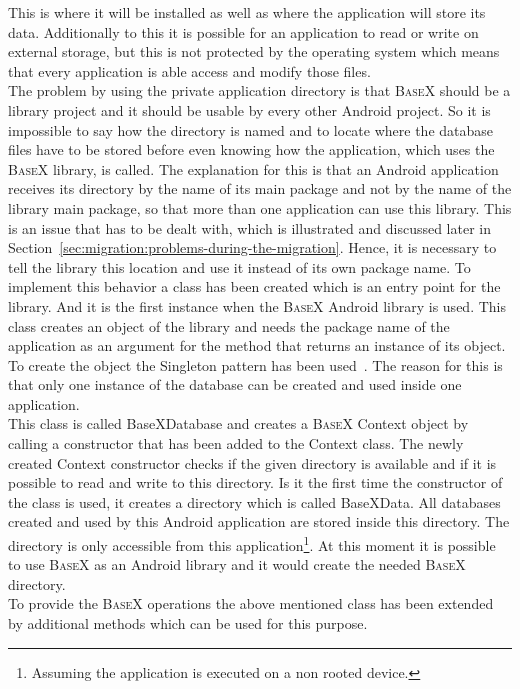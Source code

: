 This is where it will be installed as well as where the application will store its data.
Additionally to this it is possible for an application to read or write on external storage, but this is not protected by the operating system which means that every application is able access and modify those files.\\
The problem by using the private application directory is that \textsc{BaseX} should be a library project and it should be usable by every other Android project.
So it is impossible to say how the directory is named and to locate where the database files have to be stored before even knowing how the application, which uses the \textsc{BaseX} library, is called.
The explanation for this is that an Android application receives its directory by the name of its main package and not by the name of the library main package, so that more than one application can use this library.
This is an issue that has to be dealt with, which is illustrated and discussed later in Section~\ref{sec:migration:problems-during-the-migration}.
Hence, it is necessary to tell the library this location and use it instead of its own package name.
To implement this behavior a class has been created which is an entry point for the library.
And it is the first instance when the \textsc{BaseX} Android library is used.
This class creates an object of the library and needs the package name of the application as an argument for the method that returns an instance of its object.
To create the object the Singleton pattern has been used~\cite{gamma2010entwurfsmuster}.
The reason for this is that only one instance of the database can be created and used inside one application.\\
This class is called \textsf{BaseXDatabase} and creates a \textsc{BaseX} Context object by calling a constructor that has been added to the Context class.
The newly created Context constructor checks if the given directory is available and if it is possible to read and write to this directory.
Is it the first time the constructor of the class is used, it creates a directory which is called \textsf{BaseXData}.
All databases created and used by this Android application are stored inside this directory.
The directory is only accessible from this application\footnote{Assuming the application is executed on a non rooted device.}.
At this moment it is possible to use \textsc{BaseX} as an Android library and it would create the needed \textsc{BaseX} directory.\\
To provide the \textsc{BaseX} operations the above mentioned class has been extended by additional methods which can be used for this purpose.
